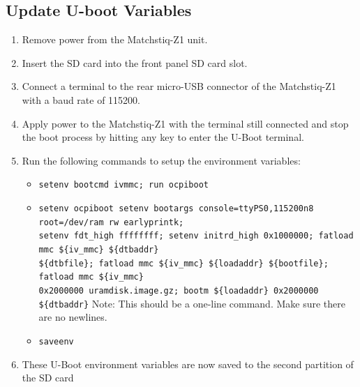 \subsection{Update U-boot Variables}
\begin{enumerate}
\item Remove power from the Matchstiq-Z1 unit.
\item Insert the SD card into the front panel SD card slot.
\item Connect a terminal to the rear micro-USB connector of the Matchstiq-Z1 with a baud rate of 115200.
\item Apply power to the Matchstiq-Z1 with the terminal still connected and stop the boot process by hitting any key to enter the U-Boot terminal.
\item Run the following commands to setup the environment variables:
\begin{itemize}
\item \texttt{setenv bootcmd \textquotesingle ivmmc; run ocpiboot\textquotesingle}
\item \texttt{setenv ocpiboot \textquotesingle setenv bootargs console=ttyPS0,115200n8 root=/dev/ram rw earlyprintk; \\
setenv fdt\_high ffffffff; setenv initrd\_high 0x1000000; fatload mmc \$\{iv\_mmc\} \$\{dtbaddr\}\\
\$\{dtbfile\}; fatload mmc \$\{iv\_mmc\} \$\{loadaddr\} \$\{bootfile\}; fatload mmc \$\{iv\_mmc\}\\
0x2000000 uramdisk.image.gz; bootm \$\{loadaddr\} 0x2000000 \$\{dtbaddr\}\textquotesingle}
\subitem *Note: This should be a one-line command. Make sure there are no newlines.
\item \texttt{saveenv}
\end{itemize}
\item These U-Boot environment variables are now saved to the second partition of the SD card
\end{enumerate}

